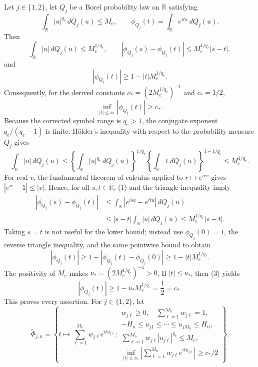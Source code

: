 Let \(j\in\{1,2\}\), let \(Q_j\) be a Borel probability law on
\(\mathbb R\) satisfying
\[
 \int_{\mathbb R}|u|^{q_e}\,dQ_j(u)\le M_e,
 \qquad
 \phi_{Q_j}(t)=\int_{\mathbb R}e^{itu}\,dQ_j(u).
\]
Then
\[
 \int_{\mathbb R}|u|\,dQ_j(u)\le M_e^{1/q_e},
 \qquad
 |\phi_{Q_j}(s)-\phi_{Q_j}(t)|
 \le M_e^{1/q_e}|s-t|,
\]
and
\[
 |\phi_{Q_j}(t)|\ge 1-|t|M_e^{1/q_e}.
\]
Consequently, for the derived constants
\(\nu_*=(2M_e^{1/q_e})^{-1}\) and \(c_*=1/2\),
\[
 \inf_{|t|\le\nu_*}|\phi_{Q_j}(t)|\ge c_*.
\]
Because the corrected symbol range is \(q_e>1\), the conjugate exponent
\(q_e/(q_e-1)\) is finite.  H\"older's inequality with respect to the
probability measure \(Q_j\) gives
\[
 \int_{\mathbb R}|u|\,dQ_j(u)
 \le
 \left\{\int_{\mathbb R}|u|^{q_e}\,dQ_j(u)\right\}^{1/q_e}
 \left\{\int_{\mathbb R}1\,dQ_j(u)\right\}^{1-1/q_e}
 \le M_e^{1/q_e}.                                                  \tag{1}
\]
For real \(v\), the fundamental theorem of calculus applied to
\(r\mapsto e^{irv}\) gives \(|e^{iv}-1|\le |v|\).  Hence, for all
\(s,t\in\mathbb R\), (1) and the triangle inequality imply
\[
 \begin{aligned}
 |\phi_{Q_j}(s)-\phi_{Q_j}(t)|
 &\le\int_{\mathbb R}|e^{isu}-e^{itu}|\,dQ_j(u)\\
 &\le |s-t|\int_{\mathbb R}|u|\,dQ_j(u)
 \le M_e^{1/q_e}|s-t|.                                            \tag{2}
 \end{aligned}
\]
Taking \(s=t\) is not useful for the lower bound; instead use
\(\phi_{Q_j}(0)=1\), the reverse triangle inequality, and the same pointwise
bound to obtain
\[
 |\phi_{Q_j}(t)|
 \ge 1-|\phi_{Q_j}(t)-\phi_{Q_j}(0)|
 \ge 1-|t|M_e^{1/q_e}.                                            \tag{3}
\]
The positivity of \(M_e\) makes
\(\nu_*=(2M_e^{1/q_e})^{-1}>0\).  If \(|t|\le\nu_*\), then (3) yields
\[
 |\phi_{Q_j}(t)|
 \ge 1-\nu_*M_e^{1/q_e}
 =\frac12=c_*.
\]
This proves every assertion.
For \(j\in\{1,2\}\), let
\[
 \widetilde\Phi_{j,n}
 =\left\{
 t\longmapsto\sum_{\ell=1}^{M_n}w_{j\ell}e^{itu_{j\ell}}:
 \begin{array}{l}
 w_{j\ell}\ge0,\quad \sum_{\ell=1}^{M_n}w_{j\ell}=1,\\
 -H_n\le u_{j1}\le\cdots\le u_{jM_n}\le H_n,\\
 \sum_{\ell=1}^{M_n}w_{j\ell}|u_{j\ell}|^{q_e}\le M_e,\\
 \displaystyle
 \inf_{|t|\le\nu_*}
 \left|\sum_{\ell=1}^{M_n}w_{j\ell}e^{itu_{j\ell}}\right|
 \ge c_*/2
 \end{array}
 \right\}.
\]
